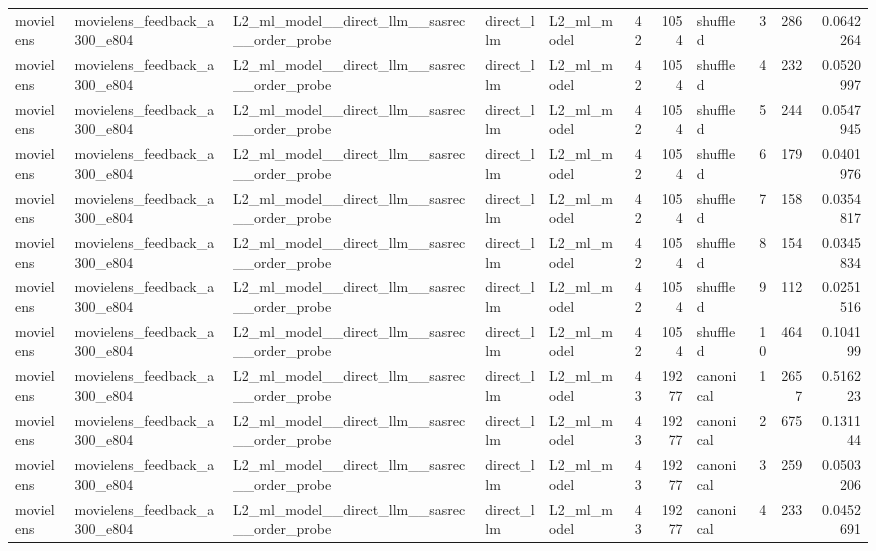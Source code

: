 \begin{table}[htbp!]
\begin{tabular}{lllllrrlrrr}
movielens & movielens\_feedback\_a300\_e804 & L2\_ml\_model\_\_direct\_llm\_\_sasrec\_\_order\_probe & direct\_llm & L2\_ml\_model & 42 & 1054 & shuffled & 3 & 286 & 0.0642264 \\
movielens & movielens\_feedback\_a300\_e804 & L2\_ml\_model\_\_direct\_llm\_\_sasrec\_\_order\_probe & direct\_llm & L2\_ml\_model & 42 & 1054 & shuffled & 4 & 232 & 0.0520997 \\
movielens & movielens\_feedback\_a300\_e804 & L2\_ml\_model\_\_direct\_llm\_\_sasrec\_\_order\_probe & direct\_llm & L2\_ml\_model & 42 & 1054 & shuffled & 5 & 244 & 0.0547945 \\
movielens & movielens\_feedback\_a300\_e804 & L2\_ml\_model\_\_direct\_llm\_\_sasrec\_\_order\_probe & direct\_llm & L2\_ml\_model & 42 & 1054 & shuffled & 6 & 179 & 0.0401976 \\
movielens & movielens\_feedback\_a300\_e804 & L2\_ml\_model\_\_direct\_llm\_\_sasrec\_\_order\_probe & direct\_llm & L2\_ml\_model & 42 & 1054 & shuffled & 7 & 158 & 0.0354817 \\
movielens & movielens\_feedback\_a300\_e804 & L2\_ml\_model\_\_direct\_llm\_\_sasrec\_\_order\_probe & direct\_llm & L2\_ml\_model & 42 & 1054 & shuffled & 8 & 154 & 0.0345834 \\
movielens & movielens\_feedback\_a300\_e804 & L2\_ml\_model\_\_direct\_llm\_\_sasrec\_\_order\_probe & direct\_llm & L2\_ml\_model & 42 & 1054 & shuffled & 9 & 112 & 0.0251516 \\
movielens & movielens\_feedback\_a300\_e804 & L2\_ml\_model\_\_direct\_llm\_\_sasrec\_\_order\_probe & direct\_llm & L2\_ml\_model & 42 & 1054 & shuffled & 10 & 464 & 0.104199 \\
movielens & movielens\_feedback\_a300\_e804 & L2\_ml\_model\_\_direct\_llm\_\_sasrec\_\_order\_probe & direct\_llm & L2\_ml\_model & 43 & 19277 & canonical & 1 & 2657 & 0.516223 \\
movielens & movielens\_feedback\_a300\_e804 & L2\_ml\_model\_\_direct\_llm\_\_sasrec\_\_order\_probe & direct\_llm & L2\_ml\_model & 43 & 19277 & canonical & 2 & 675 & 0.131144 \\
movielens & movielens\_feedback\_a300\_e804 & L2\_ml\_model\_\_direct\_llm\_\_sasrec\_\_order\_probe & direct\_llm & L2\_ml\_model & 43 & 19277 & canonical & 3 & 259 & 0.0503206 \\
movielens & movielens\_feedback\_a300\_e804 & L2\_ml\_model\_\_direct\_llm\_\_sasrec\_\_order\_probe & direct\_llm & L2\_ml\_model & 43 & 19277 & canonical & 4 & 233 & 0.0452691 \\

\end{tabular}
\end{table}
